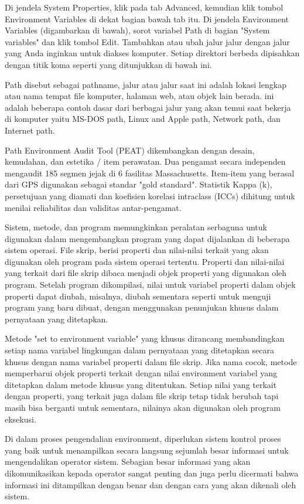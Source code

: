 Di jendela System Properties, klik pada tab Advanced, kemudian klik tombol Environment Variables di dekat bagian bawah tab itu.
Di jendela Environment Variables (digambarkan di bawah), sorot variabel Path di bagian "System variables" dan klik tombol Edit. Tambahkan atau ubah jalur jalur dengan jalur yang Anda inginkan untuk diakses komputer. Setiap direktori berbeda dipisahkan dengan titik koma seperti yang ditunjukkan di bawah ini.

Path disebut sebagai pathname, jalur atau jalur saat ini adalah lokasi lengkap atau nama tempat file komputer, halaman web, atau objek lain berada. ini adalah beberapa contoh dasar dari berbagai jalur yang akan temui saat bekerja di komputer yaitu MS-DOS path, Linux and Apple path, Network path, dan Internet path.

Path Environment Audit Tool (PEAT) dikembangkan dengan desain, kemudahan, dan estetika / item perawatan. Dua pengamat secara independen mengaudit 185 segmen jejak di 6 fasilitas Massachusetts. Item-item yang berasal dari GPS digunakan sebagai standar "gold standard". Statistik Kappa (k), persetujuan yang diamati dan koefisien korelasi intraclass (ICCs) dihitung untuk menilai reliabilitas dan validitas antar-pengamat.

Sistem, metode, dan program memungkinkan peralatan serbaguna untuk digunakan dalam mengembangkan program yang dapat dijalankan di beberapa sistem operasi. File skrip, berisi properti dan nilai-nilai terkait yang akan digunakan oleh program pada sistem operasi tertentu. Properti dan nilai-nilai yang terkait dari file skrip dibaca menjadi objek properti yang digunakan oleh program. Setelah program dikompilasi, nilai untuk variabel properti dalam objek properti dapat diubah, misalnya, diubah sementara seperti untuk menguji program yang baru dibuat, dengan menggunakan penunjukan khusus dalam pernyataan yang ditetapkan. \cite{curtis2003overriding}

Metode "set to environment variable" yang khusus dirancang membandingkan setiap nama variabel lingkungan dalam pernyataan yang ditetapkan secara khusus dengan nama variabel properti dalam file skrip. Jika nama cocok, metode memperbarui objek properti terkait dengan nilai environment variabel yang ditetapkan dalam metode khusus yang ditentukan. Setiap nilai yang terkait dengan properti, yang terkait juga dalam file skrip tetap tidak berubah tapi masih bisa berganti untuk sementara, nilainya akan digunakan oleh program eksekusi. \cite{curtis2003overriding}

Di dalam proses pengendalian environment, diperlukan sistem kontrol proses yang baik untuk menampilkan secara langsung sejumlah besar informasi untuk mengendalikan operator sistem. Sebagian besar informasi yang akan dikomunikasikan kepada operator sangat penting dan juga perlu dicermati bahwa informasi ini ditampilkan dengan benar dan dengan cara yang akan dikenali oleh sistem. \cite{kilgore1997directly}

